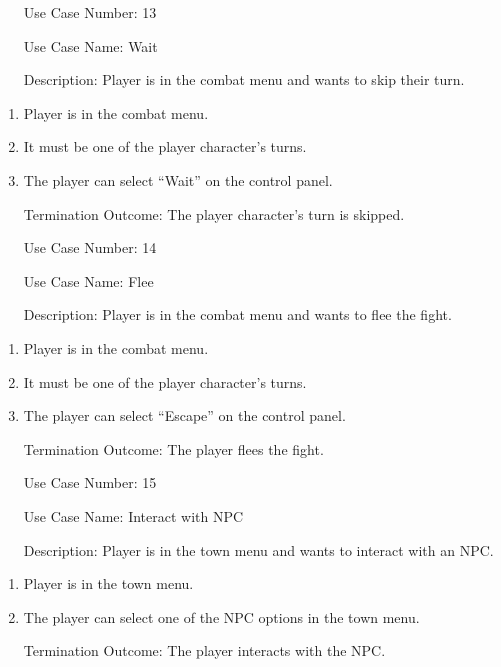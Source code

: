 \documentclass[10pt,conference,onecolumn,compsoc]{IEEEtran}
\begin{document}
\begin{itemize}
\item[Use Case Number:] 13
\item[Use Case Name:] Wait
\item[Description:] Player is in the combat menu and wants to skip their turn.
\end{itemize}
\begin{enumerate}
\item Player is in the combat menu.
\item It must be one of the player character's turns.
\item The player can select “Wait” on the control panel.
\item [Termination Outcome:] The player character's turn is skipped.
\end{enumerate}

\begin{itemize}
\item[Use Case Number:] 14
\item[Use Case Name:] Flee
\item[Description:] Player is in the combat menu and wants to flee the fight.
\end{itemize}
\begin{enumerate}
\item Player is in the combat menu.
\item It must be one of the player character's turns.
\item The player can select “Escape” on the control panel.
\item [Termination Outcome:] The player flees the fight.
\end{enumerate}

\begin{itemize}
\item[Use Case Number:] 15
\item[Use Case Name:] Interact with NPC
\item[Description:] Player is in the town menu and wants to interact with an NPC.
\end{itemize}
\begin{enumerate}
\item Player is in the town menu.
\item The player can select one of the NPC options in the town menu.
\item [Termination Outcome:] The player interacts with the NPC.
\end{enumerate}
\end{document}
